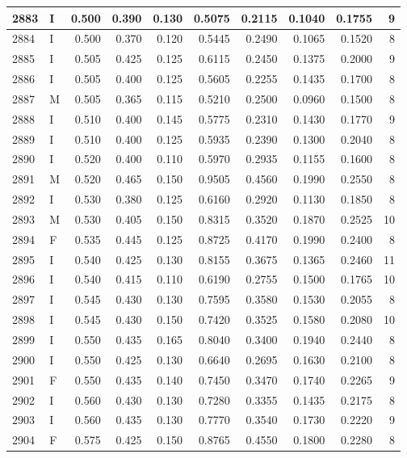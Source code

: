 \documentclass[9pt,twocolumn,twoside,]{pnas-new}
\begin{document}
\begin{tabular}{l|l|r|r|r|r|r|r|r|r}
\hline
2883 & I & 0.500 & 0.390 & 0.130 & 0.5075 & 0.2115 & 0.1040 & 0.1755 & 9\\
\hline
2884 & I & 0.500 & 0.370 & 0.120 & 0.5445 & 0.2490 & 0.1065 & 0.1520 & 8\\
\hline
2885 & I & 0.505 & 0.425 & 0.125 & 0.6115 & 0.2450 & 0.1375 & 0.2000 & 9\\
\hline
2886 & I & 0.505 & 0.400 & 0.125 & 0.5605 & 0.2255 & 0.1435 & 0.1700 & 8\\
\hline
2887 & M & 0.505 & 0.365 & 0.115 & 0.5210 & 0.2500 & 0.0960 & 0.1500 & 8\\
\hline
2888 & I & 0.510 & 0.400 & 0.145 & 0.5775 & 0.2310 & 0.1430 & 0.1770 & 9\\
\hline
2889 & I & 0.510 & 0.400 & 0.125 & 0.5935 & 0.2390 & 0.1300 & 0.2040 & 8\\
\hline
2890 & I & 0.520 & 0.400 & 0.110 & 0.5970 & 0.2935 & 0.1155 & 0.1600 & 8\\
\hline
2891 & M & 0.520 & 0.465 & 0.150 & 0.9505 & 0.4560 & 0.1990 & 0.2550 & 8\\
\hline
2892 & I & 0.530 & 0.380 & 0.125 & 0.6160 & 0.2920 & 0.1130 & 0.1850 & 8\\
\hline
2893 & M & 0.530 & 0.405 & 0.150 & 0.8315 & 0.3520 & 0.1870 & 0.2525 & 10\\
\hline
2894 & F & 0.535 & 0.445 & 0.125 & 0.8725 & 0.4170 & 0.1990 & 0.2400 & 8\\
\hline
2895 & I & 0.540 & 0.425 & 0.130 & 0.8155 & 0.3675 & 0.1365 & 0.2460 & 11\\
\hline
2896 & I & 0.540 & 0.415 & 0.110 & 0.6190 & 0.2755 & 0.1500 & 0.1765 & 10\\
\hline
2897 & I & 0.545 & 0.430 & 0.130 & 0.7595 & 0.3580 & 0.1530 & 0.2055 & 8\\
\hline
2898 & I & 0.545 & 0.430 & 0.150 & 0.7420 & 0.3525 & 0.1580 & 0.2080 & 10\\
\hline
2899 & I & 0.550 & 0.435 & 0.165 & 0.8040 & 0.3400 & 0.1940 & 0.2440 & 8\\
\hline
2900 & I & 0.550 & 0.425 & 0.130 & 0.6640 & 0.2695 & 0.1630 & 0.2100 & 8\\
\hline
2901 & F & 0.550 & 0.435 & 0.140 & 0.7450 & 0.3470 & 0.1740 & 0.2265 & 9\\
\hline
2902 & I & 0.560 & 0.430 & 0.130 & 0.7280 & 0.3355 & 0.1435 & 0.2175 & 8\\
\hline
2903 & I & 0.560 & 0.435 & 0.130 & 0.7770 & 0.3540 & 0.1730 & 0.2220 & 9\\
\hline
2904 & F & 0.575 & 0.425 & 0.150 & 0.8765 & 0.4550 & 0.1800 & 0.2280 & 8\\

\end{tabular}
\end{document}
